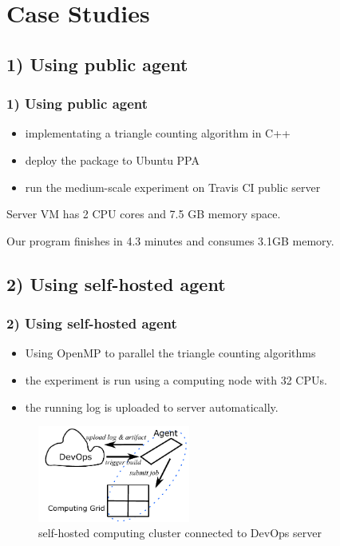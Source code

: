 \documentclass[notheorems]{beamer}
\begin{document}
\section{Case Studies}
\frame{\tableofcontents[currentsection]}
\subsection{1) Using public agent}
\begin{frame}
\frametitle{1) Using public agent}
\begin{itemize}
\item implementating a triangle counting algorithm in C++
\item deploy the package to Ubuntu PPA
\item run the medium-scale experiment on Travis CI public server
\end{itemize}
Server VM has 2 CPU cores and 7.5 GB memory space.

Our program finishes in 4.3 minutes and consumes 3.1GB memory.
\end{frame}
\subsection{2) Using self-hosted agent}
\begin{frame}
\frametitle{2) Using self-hosted agent}
\begin{itemize}
\item Using OpenMP to parallel the triangle counting algorithms
\item the experiment is run using a computing node with 32 CPUs.
\item the running log is uploaded to server automatically.
\end{itemize}
\begin{figure}
\includegraphics[width=5cm]{../self-hosted.pdf}
\caption{self-hosted computing cluster connected to DevOps server}
\end{figure}
\end{frame}
\end{document}
